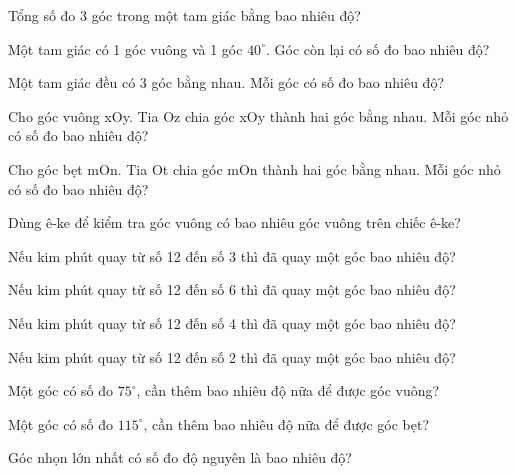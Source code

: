 \begin{ex}
Tổng số đo 3 góc trong một tam giác bằng bao nhiêu độ?
\end{ex}

\begin{ex}
Một tam giác có 1 góc vuông và 1 góc $40^\circ$. Góc còn lại có số đo bao nhiêu độ?
\end{ex}

\begin{ex}
Một tam giác đều có 3 góc bằng nhau. Mỗi góc có số đo bao nhiêu độ?
\end{ex}

\begin{ex}
Cho góc vuông xOy. Tia Oz chia góc xOy thành hai góc bằng nhau. Mỗi góc nhỏ có số đo bao nhiêu độ?
\end{ex}

\begin{ex}
Cho góc bẹt mOn. Tia Ot chia góc mOn thành hai góc bằng nhau. Mỗi góc nhỏ có số đo bao nhiêu độ?
\end{ex}

\begin{ex}
Dùng ê-ke để kiểm tra góc vuông có bao nhiêu góc vuông trên chiếc ê-ke?
\end{ex}

\begin{ex}
Nếu kim phút quay từ số 12 đến số 3 thì đã quay một góc bao nhiêu độ?
\end{ex}

\begin{ex}
Nếu kim phút quay từ số 12 đến số 6 thì đã quay một góc bao nhiêu độ?
\end{ex}

\begin{ex}
Nếu kim phút quay từ số 12 đến số 4 thì đã quay một góc bao nhiêu độ?
\end{ex}

\begin{ex}
Nếu kim phút quay từ số 12 đến số 2 thì đã quay một góc bao nhiêu độ?
\end{ex}

\begin{ex}
Một góc có số đo $75^\circ$, cần thêm bao nhiêu độ nữa để được góc vuông?
\end{ex}

\begin{ex}
Một góc có số đo $115^\circ$, cần thêm bao nhiêu độ nữa để được góc bẹt?
\end{ex}

\begin{ex}
Góc nhọn lớn nhất có số đo độ nguyên là bao nhiêu độ?
\end{ex}
